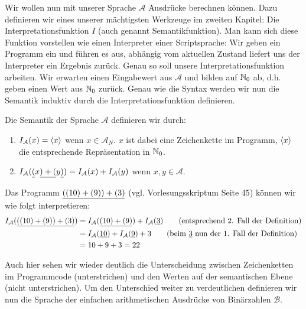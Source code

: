 Wir wollen nun mit unserer Sprache $\mathcal{A}$ Ausdrücke berechnen können.
Dazu definieren wir eines unserer mächtigsten Werkzeuge im zweiten Kapitel:
Die Interpretationsfunktion $I$ (auch genannt Semantikfunktion).
Man kann sich diese Funktion vorstellen wie einen Interpreter einer Scriptsprache:
Wir geben ein Programm ein und führen es aus, abhängig vom aktuellen Zustand liefert
uns der Interpreter ein Ergebnis zurück.
Genau so soll unsere Interpretationsfunktion arbeiten.
Wir erwarten einen Eingabewert aus $\mathcal{A}$ und bilden auf $\mathbb{N}_0$ ab, d.h. geben
einen Wert aus $\mathbb{N}_0$ zurück.
Genau wie die Syntax werden wir nun die Semantik induktiv durch die Interpretationsfunktion definieren.
\begin{defn}
Die Semantik der Sprache $\mathcal{A}$ definieren wir durch:
\begin{enumerate}
\item $I_{\mathcal{A}}(x) = \left<x\right>$ wenn $x \in \mathcal{A}_N$. $x$ ist dabei eine Zeichenkette im Programm, $\left<x\right>$ die
entsprechende Repräsentation in $\mathbb{N}_0$.
\item $I_{\mathcal{A}}(\underline{(}x\underline{)+(}y\underline{)})=I_{\mathcal{A}}(x) + I_{\mathcal{A}}(y)$ wenn $x,y \in \mathcal{A}$.
\end{enumerate}
\end{defn}
\begin{bsp}
Das Programm $\underline{((10)+(9))+(3)}$ (vgl. Vorlesungsskriptum Seite 45) können wir wie folgt interpretieren:
\begin{align*}
I_{\mathcal{A}}(\u{((10)+(9))+(3)}) &= I_{\mathcal{A}}(\u{(10)+(9)}) + I_{\mathcal{A}}(\u{3}) \tag{entsprechend 2. Fall der Definition} \\
                      &= I_{\mathcal{A}}(\u{10}) + I_{\mathcal{A}}(\u{9}) + 3 \tag{beim $\u{3}$ nun der 1. Fall der Definition} \\
                      &= 10 + 9 + 3 = 22
\end{align*}
\end{bsp}
Auch hier sehen wir wieder deutlich die Unterscheidung zwischen Zeichenketten im Programmcode (unterstrichen) und den Werten
auf der semantischen Ebene (nicht unterstrichen). Um den Unterschied weiter zu verdeutlichen
definieren wir nun die Sprache der einfachen arithmetischen Ausdrücke von Binärzahlen $\mathcal{B}$.
